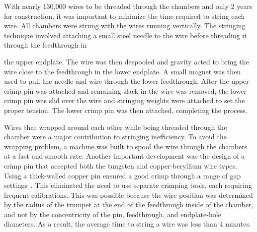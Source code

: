 With nearly 130,000 wires to be threaded through the chambers and only 2 years 
for construction, it was important to minimize the time required to string 
each wire.  All chambers were strung with 
the wires running vertically.  The stringing technique involved attaching a 
small steel needle to the wire before threading it through the feedthrough in 

the upper endplate.  The wire was then despooled and gravity acted to bring the 
wire close to the feedthrough in the lower endplate.  A small magnet was then 
used to pull the needle and wire through the lower feedthrough.  After the upper 
crimp pin was attached and remaining slack in the wire was removed, the lower 
crimp pin was slid over the wire and stringing weights were attached to set the 
proper tension.  The lower crimp pin was then attached, completing the process.
  
Wires that wrapped around each other while being threaded through the chamber 
were a major contribution to stringing inefficiency. To avoid the wrapping
problem, a machine was built to spool the wire through the chambers at a fast 
and smooth rate.  Another important development was the design of a crimp pin 
that accepted both the tungsten and copper-beryllium wire types.  Using a 
thick-walled 
copper pin ensured a good crimp through a range of gap settings~\cite{sbc}.  This 
eliminated the need to use separate crimping tools, each requiring frequent 
calibrations.  This was possible because the wire position was determined by the 
radius of the trumpet at the end of the feedthrough inside of the chamber, and 
not by the concentricity of the pin, feedthrough, and endplate-hole diameters. 
As a result, the average time to string a wire was less than 4 minutes.








